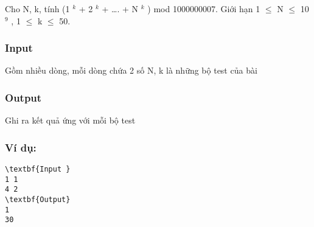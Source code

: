 

Cho N, k, tính (1 $^ k $ + 2 $^ k $ + …. + N $^ k $ ) mod 1000000007. Giới hạn 1  $\le$  N  $\le$  10 $^ 9 $ , 1  $\le$  k  $\le$  50.

\subsubsection{Input}

Gồm nhiều dòng, mỗi dòng chứa 2 số N, k là những bộ test của bài

\subsubsection{Output}

Ghi ra kết quả ứng với mỗi bộ test

\subsubsection{Ví dụ:}
\begin{verbatim}
\textbf{Input }
1 1
4 2
\textbf{Output}
1
30


\end{verbatim}
